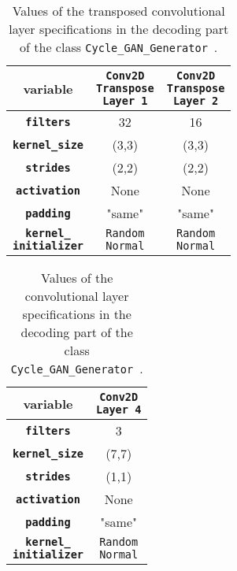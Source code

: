 \documentclass[fleqn,10pt]{SelfArx} %
\begin{document}
\begin{table}[htb]
\centering
\caption{Values of the transposed convolutional layer specifications in the decoding part of the class \texttt{Cycle\_GAN\_Generator}~\cite{image-to-image-ccan}.}
\label{tab:decoderValues1}
\begin{tabular}{c c c}
\textbf{variable} & \makecell[cc]{\textbf{\texttt{Conv2D}} \\ \textbf{\texttt{Transpose}} \\ \textbf{\texttt{Layer 1}}} & \makecell[cc]{\textbf{\texttt{Conv2D}} \\ \textbf{\texttt{Transpose}} \\ \textbf{\texttt{Layer 2}}} \\ \hline
\textbf{\texttt{filters}} & 32 & 16 \\ \hline
\textbf{\texttt{kernel\_size}} & (3,3) & (3,3)  \\ \hline
\textbf{\texttt{strides}} & (2,2) & (2,2)  \\ \hline
\textbf{\texttt{activation}} & None & None  \\ \hline 
\textbf{\texttt{padding}} & "same" & "same" \\ \hline
\makecell[cc]{\textbf{\texttt{kernel\_}} \\ \textbf{\texttt{initializer}}} & \makecell[cc]{\texttt{Random} \\ \texttt{Normal}} & \makecell[cc]{\texttt{Random} \\ \texttt{Normal}}  \\ \hline
\end{tabular}
\end{table}

\begin{table}[htb]
\centering
\caption{Values of the convolutional layer specifications in the decoding part of the class \texttt{Cycle\_GAN\_Generator}~\cite{image-to-image-ccan}.}
\label{tab:decoderValues2}
\begin{tabular}{c c}
\textbf{variable} & \makecell[cc]{\textbf{\texttt{Conv2D}} \\ \textbf{\texttt{Layer 4}}} \\ \hline
\textbf{\texttt{filters}} & 3 \\ \hline
\textbf{\texttt{kernel\_size}} & (7,7) \\ \hline
\textbf{\texttt{strides}} & (1,1) \\ \hline
\textbf{\texttt{activation}} & None \\ \hline 
\textbf{\texttt{padding}} & "same" \\ \hline
\makecell[cc]{\textbf{\texttt{kernel\_}} \\ \textbf{\texttt{initializer}}} & \makecell[cc]{\texttt{Random} \\ \texttt{Normal}} \\ \hline
\end{tabular}
\end{table}
\end{document}
